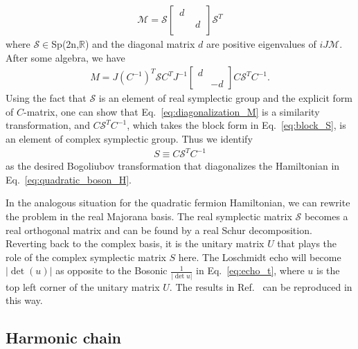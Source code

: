 \begin{equation}\begin{aligned}
\mathcal{M}=\mathcal{S}
\begin{bmatrix}
\, d \, & \\
 & \, d\, \\
\end{bmatrix}
\mathcal{S}^T
\end{aligned}\end{equation}
where $\mathcal{S}\in$Sp(2n,$\mathbb{R}$) and the diagonal matrix $d$ are positive eigenvalues of $iJ\mathcal{M}$. After some algebra, we have
\begin{equation}\begin{aligned}
\label{eq:diagonalization_M}
M=J(C^{-1})^T\mathcal{S}C^TJ^{-1}
\begin{bmatrix}
d\\
&-d
\end{bmatrix}
C\mathcal{S}^TC^{-1}.
\end{aligned}\end{equation}
Using the fact that $\mathcal{S}$ is an element of real symplectic group and the explicit form of $C$-matrix, one can show that Eq.~\eqref{eq:diagonalization_M} is a similarity transformation, and $C\mathcal{S}^TC^{-1}$, which takes the block form in Eq.~\eqref{eq:block_S}, is an element of complex symplectic group. Thus we identify 
\begin{equation*}\begin{aligned}
S\equiv C\mathcal{S}^TC^{-1}
\end{aligned}\end{equation*}
as the desired Bogoliubov transformation that diagonalizes the Hamiltonian in Eq.~\eqref{eq:quadratic_boson_H}. 

In the analogous situation for the quadratic fermion Hamiltonian, we can rewrite the problem in the real Majorana basis. The real symplectic matrix $\mathcal{S}$ becomes a real orthogonal matrix and can be found by a real Schur decomposition. Reverting back to the complex basis, it is the unitary matrix $U$ that plays the role of the complex symplectic matrix $S$ here. The Loschmidt echo will become $|\det ( u )|$ as opposite to the Bosonic $\frac{1}{|\det u|}$ in Eq.~\eqref{eq:echo_t}, where $u$ is the top left corner of the unitary matrix $U$. The results in Ref.~ can be reproduced in this way. 

\subsection{Harmonic chain} 
\label{app_sub:harmonic_chain}

